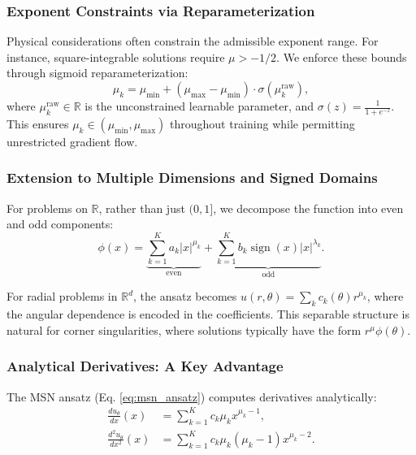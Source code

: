 \documentclass{article}
\theoremstyle{plain}
\theoremstyle{definition}
\theoremstyle{remark}
\DeclareMathOperator{\sign}{sign}
\newcommand{\R}{\mathbb{R}}
\begin{document}
\subsubsection{Exponent Constraints via Reparameterization}

Physical considerations often constrain the admissible exponent range. For instance, square-integrable solutions require $\mu > -1/2$. We enforce these bounds through sigmoid reparameterization:
\begin{equation}
	\mu_k = \mu_{\min} + (\mu_{\max} - \mu_{\min}) \cdot \sigma(\mu_k^{\text{raw}}),
\end{equation}
where $\mu_k^{\text{raw}} \in \R$ is the unconstrained learnable parameter, and $\sigma(z) = \frac{1}{1+e^{-z}}$. This ensures $\mu_k \in (\mu_{\min}, \mu_{\max})$ throughout training while permitting unrestricted gradient flow.

\subsubsection{Extension to Multiple Dimensions and Signed Domains}

For problems on $\R$, rather than just $(0,1]$, we decompose the function into even and odd components:
\begin{equation}
	\phi(x) = \underbrace{\sum_{k=1}^{K} a_k |x|^{\mu_k}}_{\text{even}} + \underbrace{\sum_{k=1}^{K} b_k \sign(x)|x|^{\lambda_k}}_{\text{odd}}.
\end{equation}

For radial problems in $\R^d$, the ansatz becomes $u(r,\theta) = \sum_k c_k(\theta) r^{\mu_k}$, where the angular dependence is encoded in the coefficients. This separable structure is natural for corner singularities, where solutions typically have the form $r^\mu \phi(\theta)$.

\subsubsection{Analytical Derivatives: A Key Advantage}

The MSN ansatz (Eq. \ref{eq:msn_ansatz}) computes derivatives analytically:
\begin{align}
	\frac{d u_\theta}{dx}(x)     & = \sum_{k=1}^{K} c_k \mu_k x^{\mu_k - 1},             \\
	\frac{d^2 u_\theta}{dx^2}(x) & = \sum_{k=1}^{K} c_k \mu_k (\mu_k - 1) x^{\mu_k - 2}.
\end{align}
\end{document}
